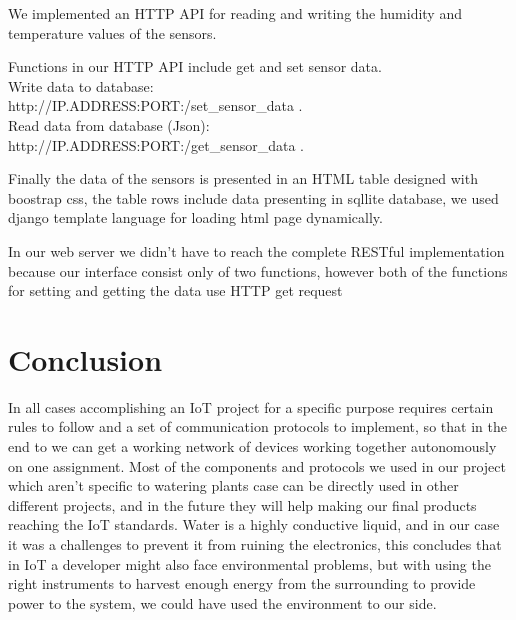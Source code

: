 \documentclass[11pt,paper=a4,parskip=half]{scrartcl}
\begin{document}
We implemented an HTTP API for reading and writing the humidity and temperature
values of the sensors.

Functions in our HTTP API include get and set sensor data.\\

Write data to database:
\\ http://IP.ADDRESS:PORT:/set\_sensor\_data . \\

Read data from database (Json):
\\ http://IP.ADDRESS:PORT:/get\_sensor\_data .

Finally the data of the sensors is presented in an HTML table designed with
boostrap css, the table rows include data presenting in sqllite database, we
used django template language for loading html page dynamically.

In our web server we didn't have to reach the complete RESTful implementation
because our interface consist only of two functions, however both of the
functions for setting and getting the data use HTTP get request

\section{Conclusion}

In all cases accomplishing an IoT project for a specific purpose requires
certain rules to follow and a set of communication protocols to implement, so
that in the end to we can get a working network of devices working together
autonomously on one assignment. Most of the components and protocols we used in
our project which aren't specific to watering plants case can be directly used
in other different projects, and in the future they will help making our final
products reaching the IoT standards. Water is a highly conductive liquid, and
in our case it was a challenges to prevent it from ruining the electronics,
this concludes that in IoT a developer might also face environmental problems,
but with using the right instruments to harvest enough energy from the
surrounding to provide power to the system, we could have used the environment
to our side.

\newpage
\nocite{*}


\end{document}
